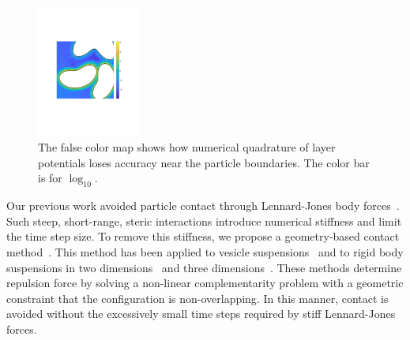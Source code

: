 %
\begin{figure}
\centerline{\includegraphics[width=0.30\textwidth]{figures/BIError.pdf}}
  \vspace{-8pt}
\caption{
\label{fig:bierror}  
\footnotesize The false color map shows how numerical quadrature of
  layer potentials loses accuracy near the particle boundaries.  The
  color bar is for $\log_{10}.$}
\end{figure}
%
Our previous work avoided particle contact through Lennard-Jones body
forces~\cite{Fu2018_SIAM}. Such steep, short-range, steric interactions 
introduce numerical stiffness and limit the time step size. To
remove this stiffness, we propose a geometry-based contact
method~\cite{har-pon-sor-zor2011}. This method has been applied to
vesicle suspensions~\cite{lu-rah-zor2017} and to rigid body suspensions in
two dimensions~\cite{bys-sha-qua2020} and three
dimensions~\cite{Yan2019}. These methods determine repulsion force by
solving a non-linear complementarity problem with a geometric constraint
that the configuration is non-overlapping. In this manner, contact is
avoided without the excessively small time steps required by stiff
Lennard-Jones forces.

